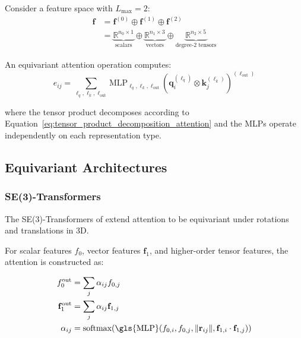 \begin{example}\label{ex:feature_space_decomposition}
Consider a feature space with $L_{\max} = 2$:
\begin{align}
\mathbf{f} &= \mathbf{f}^{(0)} \oplus \mathbf{f}^{(1)} \oplus \mathbf{f}^{(2)} \\
&= \underbrace{\mathbb{R}^{n_0 \times 1}}_{\text{scalars}} \oplus \underbrace{\mathbb{R}^{n_1 \times 3}}_{\text{vectors}} \oplus \underbrace{\mathbb{R}^{n_2 \times 5}}_{\text{degree-2 tensors}}
\label{eq:feature_space_example}
\end{align}

An equivariant attention operation computes:
\begin{equation}
e_{ij} = \sum_{\ell_q, \ell_k, \ell_{\text{out}}} \text{MLP}_{\ell_q, \ell_k, \ell_{\text{out}}} \left( \mathbf{q}_i^{(\ell_q)} \otimes \mathbf{k}_j^{(\ell_k)} \right)^{(\ell_{\text{out}})}
\label{eq:equivariant_attention_score_irreps}
\end{equation}

where the tensor product decomposes according to Equation~\eqref{eq:tensor_product_decomposition_attention} and the MLPs operate independently on each representation type.
\end{example}

\subsection{Equivariant Architectures}\label{sec:equivariant_transformers}

\subsubsection[SE(3)-Transformers]{SE(3)-\glspl{Transformer}}

The SE(3)-\glspl{Transformer} of \citet{fuchs2020se3transformers} extend attention to be equivariant under rotations and translations in 3D.

For scalar features $f_0$, vector features $\mathbf{f}_1$, and higher-order tensor features, the attention is constructed as:

\begin{align}
    f_0^{\text{out}} &= \sum_j \alpha_{ij} f_{0,j} \\
    \mathbf{f}_1^{\text{out}} &= \sum_j \alpha_{ij} \mathbf{f}_{1,j} \\
    \alpha_{ij} &= \text{softmax}(\text{\gls{MLP}}(f_{0,i}, f_{0,j}, \|\mathbf{r}_{ij}\|, \mathbf{f}_{1,i} \cdot \mathbf{f}_{1,j}))
    \label{eq:se3_transformer_attention}
\end{align}

